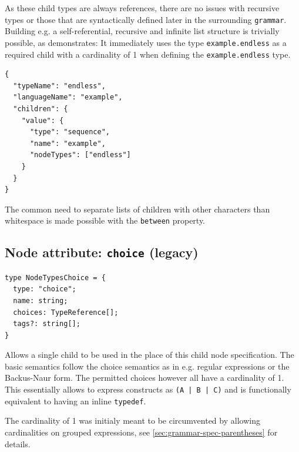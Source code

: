 \documentclass[]{report}
\begin{document}
As these child types are always references, there are no issues with recursive types or those that are syntactically defined later in the surrounding \texttt{grammar}. Building e.g. a self-referential, recursive and infinite list structure is trivially possible, as  demonstrates: It immediately uses the type \texttt{example.endless} as a required child with a cardinality of 1 when defining the \texttt{example.endless} type.

\begin{listing}[H]
\begin{verbatim}
{
  "typeName": "endless",
  "languageName": "example",
  "children": {
    "value": {
      "type": "sequence",
      "name": "example",
      "nodeTypes": ["endless"]
    }
  }
}
\end{verbatim}
\caption{Example of recursive, endless list structure in \texttt{JSON}-representation}
\label{lst:grammar-children-recursive-endless-list}
\end{listing}

The common need to separate lists of children with other characters than whitespace is made possible with the \texttt{between} property.

\cite[Chapter 8: Interleaving]{clarkRELAXNGSpecification2001}

\subsection{Node attribute: \texttt{choice} (legacy)}

\begin{listing}[H]
\begin{verbatim}
type NodeTypesChoice = {
  type: "choice";
  name: string;
  choices: TypeReference[];
  tags?: string[];
}
\end{verbatim}
\caption{Type definition of \texttt{choice} child specification}
\label{lst:grammar-children-description}
\end{listing}

Allows a single child to be used in the place of this child node specification. The basic semantics follow the choice semantics as in e.g. regular expressions or the Backus-Naur form. The permitted choices however all have a cardinality of 1. This essentially allows to express constructs as \texttt{(A | B | C)} and is functionally equivalent to having an inline \texttt{typedef}.

The cardinality of 1 was initialy meant to be circumvented by allowing cardinalities on grouped expressions, see \cref{sec:grammar-spec-parentheses} for details.
\end{document}
